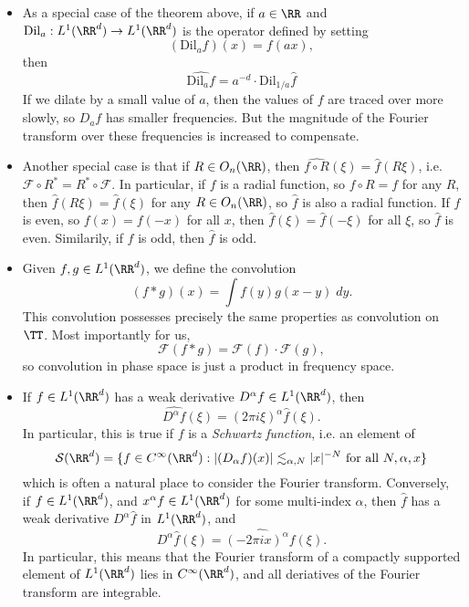 \begin{itemize}
    \item As a special case of the theorem above, if $a \in \RR$ and $\text{Dil}_a: L^1(\RR^d) \to L^1(\RR^d)$ is the operator defined by setting
    \[ (\text{Dil}_a f)(x) = f(ax), \]
    then
    \[ \widehat{\text{Dil}_a f} = a^{-d} \cdot \text{Dil}_{1/a}\widehat{f} \]
    If we dilate by a small value of $a$, then the values of $f$ are traced over more slowly, so $D_a f$ has smaller frequencies. But the magnitude of the Fourier transform over these frequencies is increased to compensate.

    \item Another special case is that if $R \in O_n(\RR)$, then $\widehat{f \circ R}(\xi) = \widehat{f}(R \xi)$, i.e. $\mathcal{F} \circ R^* = R^* \circ \mathcal{F}$. In particular, if $f$ is a radial function, so $f \circ R = f$ for any $R$, then $\widehat{f}(R \xi) = \widehat{f}(\xi)$ for any $R \in O_n(\RR)$, so $\widehat{f}$ is also a radial function. If $f$ is even, so $f(x) = f(-x)$ for all $x$, then $\widehat{f}(\xi) = \widehat{f}(-\xi)$ for all $\xi$, so $\widehat{f}$ is even. Similarily, if $f$ is odd, then $\widehat{f}$ is odd.

    \item Given $f,g \in L^1(\RR^d)$, we define the convolution
    \[ (f * g)(x) = \int f(y) g(x-y)\; dy. \]
    This convolution possesses precisely the same properties as convolution on $\TT$. Most importantly for us,
    \[ \mathcal{F}(f * g) = \mathcal{F}(f) \cdot \mathcal{F}(g), \]
    so convolution in phase space is just a product in frequency space.

    \item If $f \in L^1(\RR^d)$ has a weak derivative $D^\alpha f \in L^1(\RR^d)$, then
    \[ \widehat{D^\alpha f}(\xi) = (2 \pi i \xi)^\alpha \widehat{f}(\xi). \]
    In particular, this is true if $f$ is a \emph{Schwartz function}, i.e. an element of
    \[ \mathcal{S}(\RR^d) = \{ f \in C^\infty(\RR^d): |(D_\alpha f)(x)| \lesssim_{\alpha,N} |x|^{-N}\ \text{for all $N, \alpha, x$} \} \]
    which is often a natural place to consider the Fourier transform. Conversely, if $f \in L^1(\RR^d)$, and $x^\alpha f \in L^1(\RR^d)$ for some multi-index $\alpha$, then $\widehat{f}$ has a weak derivative $D^\alpha \widehat{f}$ in $L^1(\RR^d)$, and
    \[ D^\alpha \widehat{f}(\xi) = \widehat{(-2 \pi i x)^\alpha f}(\xi). \]
    In particular, this means that the Fourier transform of a compactly supported element of $L^1(\RR^d)$ lies in $C^\infty(\RR^d)$, and all deriatives of the Fourier transform are integrable.
\end{itemize}

